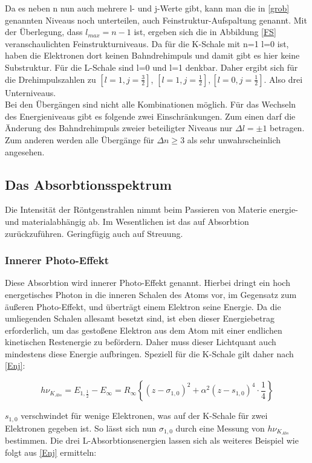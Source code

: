 Da es neben n nun auch mehrere l- und j-Werte gibt, kann man die in \ref{grob} genannten Niveaus noch unterteilen, auch
Feinstruktur-Aufspaltung genannt. Mit der Überlegung, dass $l_{max} = n-1$ ist, ergeben sich die in Abbildung \eqref{FS}
veranschaulichten Feinstrukturniveaus. Da für die K-Schale mit n=1 l=0 ist, haben die Elektronen dort keinen Bahndrehimpuls
und damit gibt es hier keine Substruktur. Für die L-Schale sind l=0 und l=1 denkbar. Daher ergibt sich für die Drehimpulszahlen
zu $[l=1,j=\frac32]$, $[l=1,j=\frac12],[l=0,j=\frac12] $. Also drei Unterniveaus.\\
Bei den Übergängen sind nicht alle Kombinationen möglich. Für das Wechseln des Energieniveaus gibt es folgende zwei Einschränkungen.
Zum einen darf die Änderung des Bahndrehimpuls zweier beteiligter Niveaus nur $\Delta l = \pm1$ betragen. Zum anderen werden
alle Übergänge für $\Delta n \ge 3$ als sehr unwahrscheinlich angesehen.

\subsection{Das Absorbtionsspektrum}
Die Intensität der Röntgenstrahlen nimmt beim Passieren von Materie energie- und materialabhängig ab. Im Wesentlichen
ist das auf Absorbtion zurückzuführen. Geringfügig auch auf Streuung.
\subsubsection{Innerer Photo-Effekt}
Diese Absorbtion wird innerer Photo-Effekt genannt. Hierbei dringt ein hoch energetisches Photon in die inneren Schalen
des Atoms vor, im Gegensatz zum äußeren Photo-Effekt, und überträgt einem Elektron seine Energie. Da die umliegenden Schalen
allesamt besetzt sind, ist eben dieser Energiebetrag erforderlich, um das gestoßene Elektron aus dem Atom mit einer endlichen
kinetischen Restenergie zu befördern. Daher muss dieser Lichtquant auch mindestens diese Energie aufbringen. Speziell für die
K-Schale gilt daher nach \eqref{Enj}:

\begin{equation}
 h\nu_{K_{Abs}} = E_{1,\frac12} - E_{\infty} = R_{\infty}\left\{(z-\sigma_{1,0})^2 + \alpha^2(z - s_{1,0})^4\cdot \frac14\right\}
 \label{K1}
\end{equation}

$s_{1,0}$ verschwindet für wenige Elektronen, was auf der K-Schale für zwei Elektronen gegeben ist. So lässt sich nun $\sigma_{1,0}$
durch eine Messung von $h\nu_{K_{Abs}}$ bestimmen. Die drei L-Absorbtionsenergien lassen sich als weiteres Beispiel wie folgt
aus \eqref{Enj} ermitteln:

